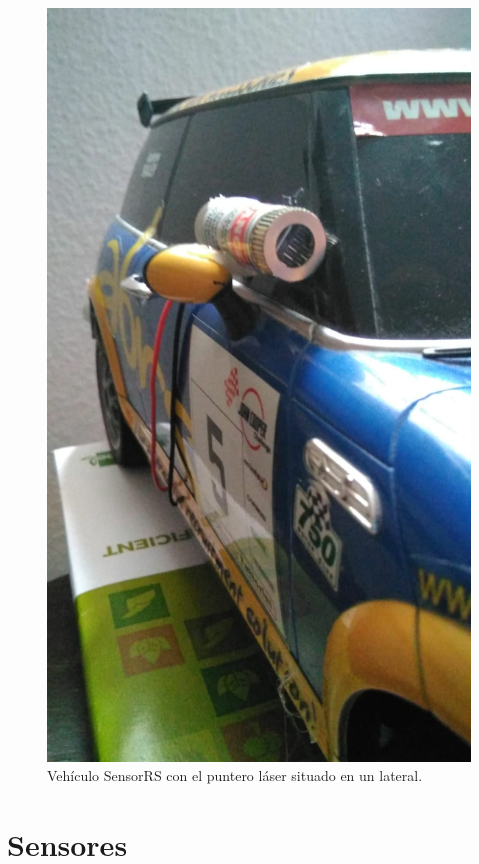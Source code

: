 \begin{figure}[H]
  \begin{center}
   \includegraphics[scale=0.2]{imagenes/robot/puntero_laser.jpg}
  \end{center}
  \caption{Vehículo SensorRS con el puntero láser situado en un lateral.}
  \label{vista-conexiones}
\end{figure}

\section{Sensores}

